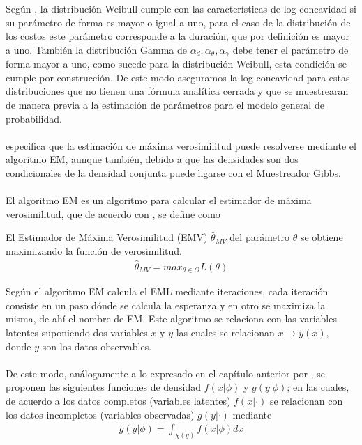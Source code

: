 Seg\'un \cite{bagnoli2005log}, la distribuci\'on Weibull cumple con las caracter\'isticas de log-concavidad si su par\'ametro de forma es mayor o igual a uno, para el caso de la distribuci\'on de los costos este par\'ametro corresponde a la duraci\'on, que por definici\'on es mayor a uno. Tambi\'en la distribuci\'on Gamma de $\alpha_d,\alpha_\theta, \alpha_\gamma$ debe tener el par\'ametro de forma mayor a uno, como sucede para la distribuci\'on Weibull, esta condici\'on se cumple por construcci\'on. De este modo aseguramos la log-concavidad para estas distribuciones que no tienen una f\'ormula anal\'itica cerrada y que se muestrearan de manera previa a la estimaci\'on de par\'ametros para el modelo general de probabilidad.\\
\\
\cite{pitt2002constructing} especifica que la estimaci\'on de m\'axima verosimilitud puede resolverse mediante el algoritmo EM, aunque tambi\'en, debido a que las densidades son dos condicionales de la densidad conjunta puede ligarse con el Muestreador Gibbs.\\
\\
El algoritmo EM es un algoritmo para calcular el estimador de m\'axima verosimilitud, que de acuerdo con \cite{held2014applied}, se define como
\begin{defi}
El Estimador de M\'axima Verosimilitud (EMV) $\hat{\theta}_{MV}$ del par\'ametro $\theta$ se obtiene maximizando la funci\'on de verosimilitud.
\begin{align*}
\hat{\theta}_{MV}=max_{\theta \in \Theta} L(\theta)
\end{align*} 
\end{defi}
Seg\'un \cite{dempster1977maximum} el algoritmo EM calcula el EML mediante iteraciones, cada iteraci\'on consiste en un paso d\'onde se calcula la esperanza y en otro  se maximiza la misma, de ah\'i el nombre de EM. Este algoritmo se relaciona con las variables latentes suponiendo dos variables $x$ y $y$ las cuales se relacionan $x \to y(x)$, donde $y$ son los datos observables.\\
\\
De este modo, an\'alogamente a lo expresado en el cap\'itulo anterior por \cite{pitt2002constructing}, se proponen las siguientes funciones de densidad $f(x|\phi)$ y $g(y|\phi)$; en las cuales, de acuerdo a \cite{dempster1977maximum} los datos completos (variables latentes) $f(x|\cdot)$ se relacionan con los datos incompletos (variables observadas) $g(y|\cdot)$ mediante
\begin{align*}
g(y|\phi)=\int_{\chi(y)} f(x|\phi)dx
\end{align*}
